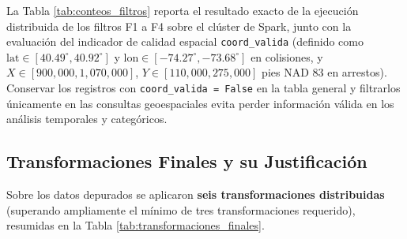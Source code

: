 \documentclass[11pt,a4paper]{article}
\begin{document}
La Tabla \ref{tab:conteos_filtros} reporta el resultado exacto de la ejecución distribuida de los filtros F1 a F4 sobre el clúster de Spark, junto con la evaluación del indicador de calidad espacial \texttt{coord\_valida} (definido como $\text{lat} \in [40.49^\circ, 40.92^\circ]$ y $\text{lon} \in [-74.27^\circ, -73.68^\circ]$ en colisiones, y $X \in [900{,}000, 1{,}070{,}000]$, $Y \in [110{,}000, 275{,}000]$ pies NAD 83 en arrestos). Conservar los registros con \texttt{coord\_valida = False} en la tabla general y filtrarlos únicamente en las consultas geoespaciales evita perder información válida en los análisis temporales y categóricos.

\begin{table}[H]
\centering
\scriptsize
\renewcommand{\arraystretch}{1.2}
\caption{Conteo de registros antes y después de los filtros de integridad y validación espacial en Spark.}
\label{tab:conteos_filtros}
\end{table}

\subsection{Transformaciones Finales y su Justificación}
\label{subsec:limpieza_datos}

Sobre los datos depurados se aplicaron \textbf{seis transformaciones distribuidas} (superando ampliamente el mínimo de tres transformaciones requerido), resumidas en la Tabla \ref{tab:transformaciones_finales}.
\end{document}
